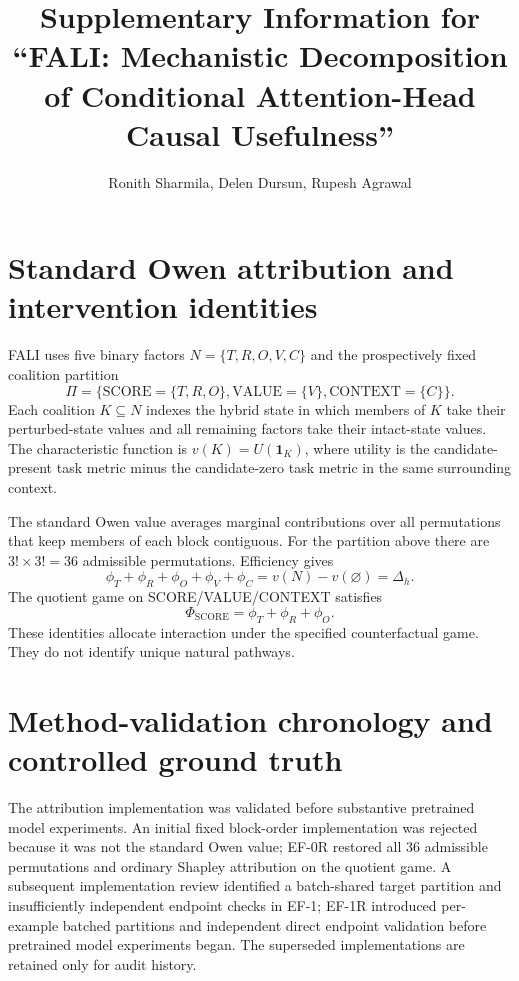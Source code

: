 \documentclass[pdflatex,sn-apa]{sn-jnl}
\begin{document}
\title{Supplementary Information for ``FALI: Mechanistic Decomposition of Conditional Attention-Head Causal Usefulness''}
\author*{Ronith Sharmila, Delen Dursun, Rupesh Agrawal}
\maketitle
\section{Standard Owen attribution and intervention identities}

FALI uses five binary factors $N=\{T,R,O,V,C\}$ and the prospectively fixed
coalition partition
\[
\Pi=\{\mathrm{SCORE}=\{T,R,O\},\mathrm{VALUE}=\{V\},\mathrm{CONTEXT}=\{C\}\}.
\]
Each coalition $K\subseteq N$ indexes the hybrid state in which members of $K$
take their perturbed-state values and all remaining factors take their intact-state
values. The characteristic function is $v(K)=U(\mathbf{1}_K)$, where utility is the
candidate-present task metric minus the candidate-zero task metric in the same
surrounding context.

The standard Owen value averages marginal contributions over all permutations
that keep members of each block contiguous. For the partition above there are
$3!\times 3!=36$ admissible permutations. Efficiency gives
\[
\phi_T+\phi_R+\phi_O+\phi_V+\phi_C
=v(N)-v(\varnothing)
=\Delta_h.
\]
The quotient game on SCORE/VALUE/CONTEXT satisfies
\[
\Phi_{\mathrm{SCORE}}=\phi_T+\phi_R+\phi_O.
\]
These identities allocate interaction under the specified counterfactual game.
They do not identify unique natural pathways.

\section{Method-validation chronology and controlled ground truth}

The attribution implementation was validated before substantive pretrained
model experiments. An initial fixed block-order implementation was rejected
because it was not the standard Owen value; EF-0R restored all 36 admissible
permutations and ordinary Shapley attribution on the quotient game. A subsequent
implementation review identified a batch-shared target partition and
insufficiently independent endpoint checks in EF-1; EF-1R introduced
per-example batched partitions and independent direct endpoint validation before
pretrained model experiments began. The superseded implementations are retained
only for audit history.
\end{document}
